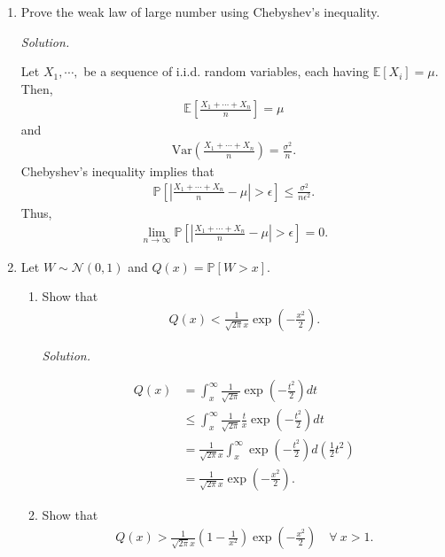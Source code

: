 \documentclass{article}
\begin{document}
\begin{enumerate}
\item Prove the weak law of large number using Chebyshev's inequality.

\emph{Solution.}

Let $X_1,\cdots,$ be a sequence of i.i.d. random variables, each having $\mathbb{E}[X_i]=\mu$. Then,
	\begin{align*}
	\mathbb{E}\left[\frac{X_1+\cdots+X_n}{n}\right]=\mu	
	\end{align*}
and
	\begin{align*}
	\text{Var}\left(\frac{X_1+\cdots+X_n}{n}\right)=\frac{\sigma^2}{n}.
	\end{align*}
Chebyshev's inequality implies that
	\begin{align*}
	\mathbb{P}\left[\left|\frac{X_1+\cdots+X_n}{n}-\mu\right|>\epsilon\right]\leq \frac{\sigma^2}{n\epsilon^2}.	
	\end{align*}
Thus,
	\begin{align*}
	\lim_{n\rightarrow\infty}	\mathbb{P}\left[\left|\frac{X_1+\cdots+X_n}{n}-\mu\right|>\epsilon\right]=0.
	\end{align*}


\item Let $W\sim\mathcal{N}(0,1)$ and $Q(x)=\mathbb{P}[W>x]$.

\begin{enumerate}
\item Show that
	\begin{align*}
	Q(x)<\frac{1}{\sqrt{2\pi}x}\exp\left(-\frac{x^2}{2}\right).	
	\end{align*}
	
\emph{Solution.}

	\begin{align*}
	Q(x)&=\int_x^\infty \frac{1}{\sqrt{2\pi}}\exp\left(-\frac{t^2}{2}\right)dt\\
	&\leq \int_x^\infty \frac{1}{\sqrt{2\pi}}\frac{t}{x}\exp\left(-\frac{t^2}{2}\right)dt\\
	&=\frac{1}{\sqrt{2\pi}x} \int_x^\infty \exp\left(-\frac{t^2}{2}\right) d\left(\frac{1}{2}t^2\right)\\
	&=\frac{1}{\sqrt{2\pi}x} \exp\left(-\frac{x^2}{2}\right).	
	\end{align*}


\item Show that
	\begin{align*}
	Q(x)>\frac{1}{\sqrt{2\pi}x}\left(1-\frac{1}{x^2}\right)\exp\left(-\frac{x^2}{2}\right)\quad\forall~x>1.
	\end{align*}
	

\end{enumerate}
\end{enumerate}
\end{document}
